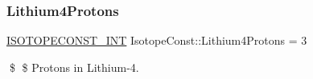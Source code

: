 \subsubsection{\texorpdfstring{Lithium4\+Protons}{Lithium4Protons}}
{\footnotesize\ttfamily \mbox{\hyperlink{group___isotope_const-_macros_ga5f18360b3e99483a35c32d789e62621c}{I\+S\+O\+T\+O\+P\+E\+C\+O\+N\+S\+T\+\_\+\+I\+NT}} Isotope\+Const\+::\+Lithium4\+Protons = 3}

\$ \$ Protons in Lithium-\/4. 